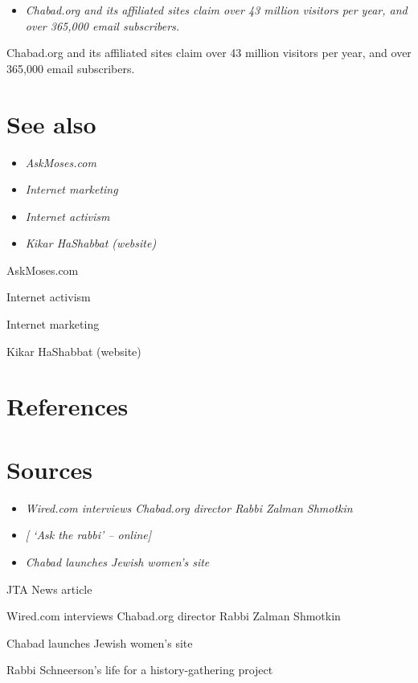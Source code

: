 \begin{itemize}
\item
  \emph{Chabad.org and its affiliated sites claim over 43 million
  visitors per year, and over 365,000 email subscribers.}
\end{itemize}

Chabad.org and its affiliated sites claim over 43 million visitors per
year, and over 365,000 email subscribers.

\section{See also}\label{see-also}

\begin{itemize}
\item
  \emph{AskMoses.com}
\item
  \emph{Internet marketing}
\item
  \emph{Internet activism}
\item
  \emph{Kikar HaShabbat (website)}
\end{itemize}

AskMoses.com

Internet activism

Internet marketing

Kikar HaShabbat (website)

\section{References}\label{references}

\section{Sources}\label{sources}

\begin{itemize}
\item
  \emph{Wired.com interviews Chabad.org director Rabbi Zalman Shmotkin}
\item
  \emph{{[} `Ask the rabbi' -- online{]}}
\item
  \emph{Chabad launches Jewish women's site}
\end{itemize}

JTA News article

Wired.com interviews Chabad.org director Rabbi Zalman Shmotkin

Chabad launches Jewish women's site

Rabbi Schneerson's life for a history-gathering project

